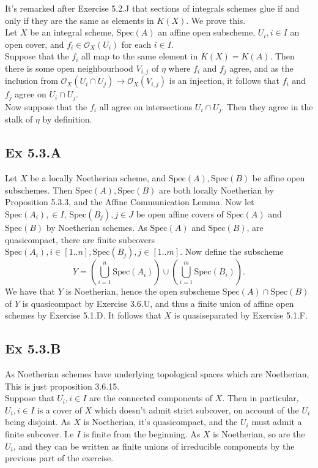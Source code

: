 \documentclass{article}
\theoremstyle{definition}
\newcommand{\ox}{\mathcal{O}_X}
\newcommand{\Spec}{\text{Spec}}
\begin{document}
It's remarked after Exercise 5.2.J that sections of integrals schemes glue if
and only if they are the same as elements in $K(X)$. We prove this. \\

Let $X$ be an integral scheme, $\Spec(A)$ an affine open subscheme, $U_i, i \in
	I$ an open cover, and $f_i \in \ox(U_i)$ for each $i \in I$. \\

Suppose that the $f_i$ all map to the same element in $K(X) = K(A)$. Then there
is some open neighbourhood $V_{i,j}$ of $\eta$ where $f_i$ and $f_j$ agree, and
as the inclusion from $\ox(U_i \cap U_j) \to \ox(V_{i, j})$ is an injection, it
follows that $f_i$ and $f_j$ agree on $U_i \cap U_j$. \\

Now suppose that the $f_i$ all agree on intersections $U_i \cap U_j$. Then they
agree in the stalk of $\eta$ by definition.

\subsection*{Ex 5.3.A}

Let $X$ be a locally Noetherian scheme, and $\Spec(A), \Spec(B)$ be affine open
subschemes. Then $\Spec(A), \Spec(B)$ are both locally Noetherian by
Proposition 5.3.3, and the Affine Communication Lemma. Now let $\Spec(A_i), \in
	I,\, \Spec(B_j), j \in J$ be open affine covers of $\Spec(A)$ and $\Spec(B)$ by
Noetherian schemes. As $\Spec(A)$ and $\Spec(B)$, are quasicompact, there are
finite subcovers $\Spec(A_i), i \in [1..n], \Spec(B_j), j \in [1..m]$. Now
define the subscheme
\[
	Y
	=
	\left(
	\bigcup_{i = 1}^{n} \Spec(A_i)
	\right)
	\cup
	\left(
	\bigcup_{i = 1}^{m} \Spec(B_i)
	\right).
\]
We have that $Y$ is Noetherian, hence the open subscheme $\Spec(A) \cap
	\Spec(B)$ of $Y$ is quasicompact by Exercise 3.6.U, and thus a finite union of
affine open schemes by Exercise 5.1.D. It follows that $X$ is quasiseparated by
Exercise 5.1.F.

\subsection*{Ex 5.3.B}

As Noetherian schemes have underlying topological spaces which are Noetherian,
This is just proposition 3.6.15. \\

Suppose that $U_i, i \in I$ are the connected components of $X$. Then in
particular, $U_i, i \in I$ is a cover of $X$ which doesn't admit strict
subcover, on account of the $U_i$ being disjoint. As $X$ is Noetherian, it's
quasicompact, and the $U_i$ must admit a finite subcover. I.e $I$ is finite
from the beginning. As $X$ is Noetherian, so are the $U_i$, and they can be
written as finite unions of irreducible components by the previous part of the
exercise.
\end{document}
